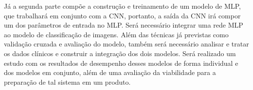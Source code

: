 Já a segunda parte compõe a construção e treinamento de um modelo de \acs{MLP}, que trabalhará em conjunto com a \acs{CNN}, portanto, a saída da \acs{CNN} irá compor um dos parâmetros de entrada no \acs{MLP}. Será necessário integrar uma rede \acs{MLP} ao modelo de classificação de imagens. Além das técnicas já previstas como validação cruzada e avaliação do modelo, também será necessário analisar e tratar os dados clínicos e construir a integração dos dois modelos. Será realizado um estudo com os resultados de desempenho desses modelos de forma individual e dos modelos em conjunto, além de uma avaliação da viabilidade para a preparação de tal sistema em um produto.
%
%
%
%
%
%
%
%
